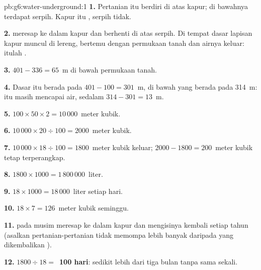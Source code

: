 \begin{solution}{pb:g6:water-underground:1}
\textbf{1.} Pertanian itu berdiri di atas kapur; di bawahnya terdapat
serpih. Kapur itu , serpih tidak.

\textbf{2.}  meresap ke dalam kapur dan berhenti di atas serpih. Di
tempat dasar lapisan kapur muncul di lereng,  bertemu dengan
permukaan tanah dan airnya keluar: itulah .

\textbf{3.} $401 - 336 = 65$~m di bawah permukaan tanah.

\textbf{4.} Dasar  itu berada pada $401 - 100 = 301$~m, di bawah  yang berada pada 314~m:  itu masih mencapai air, sedalam $314 - 301 =
13$~m.

\textbf{5.} $100 \times 50 \times 2 = 10\,000$~meter kubik.

\textbf{6.} $10\,000 \times 20 \div 100 = 2000$~meter kubik.

\textbf{7.} $10\,000 \times 18 \div 100 = 1800$~meter kubik keluar;
$2000 - 1800 = 200$~meter kubik tetap terperangkap.

\textbf{8.} $1800 \times 1000 = 1\,800\,000$~liter.

\textbf{9.} $18 \times 1000 = 18\,000$~liter setiap hari.

\textbf{10.} $18 \times 7 = 126$~meter kubik seminggu.

\textbf{11.}  pada musim  meresap ke dalam kapur dan mengisinya
kembali setiap tahun (asalkan pertanian-pertanian tidak memompa lebih banyak
daripada yang dikembalikan ).

\textbf{12.} $1800 \div 18 = $~\textbf{100 hari}: sedikit lebih dari tiga
bulan tanpa  sama sekali.
\end{solution}
